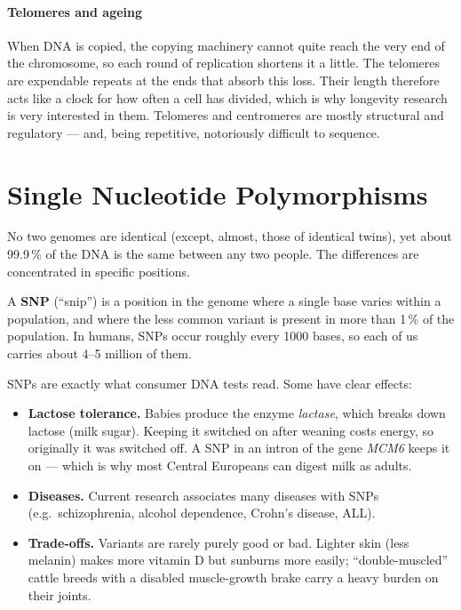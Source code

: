 \documentclass[11pt, oneside]{book}
\let\originalsection\section
\renewcommand{\section}{\Needspace{7\baselineskip}\originalsection}
\begin{document}
\paragraph{Telomeres and ageing}
When DNA is copied, the copying machinery cannot quite reach the very end of
the chromosome, so each round of replication shortens it a little. The
telomeres are expendable repeats at the ends that absorb this loss. Their
length therefore acts like a clock for how often a cell has divided, which is
why longevity research is very interested in them. Telomeres and centromeres
are mostly structural and regulatory --- and, being repetitive, notoriously
difficult to sequence.

\section{Single Nucleotide Polymorphisms}

No two genomes are identical (except, almost, those of identical twins), yet
about 99.9\,\% of the DNA is the same between any two people. The
differences are concentrated in specific positions.

\begin{defbox}[title={Single Nucleotide Polymorphism (SNP)}]
A \textbf{SNP} (``snip'') is a position in the genome where a single base
varies within a population, and where the less common variant is present in
more than 1\,\% of the population. In humans, SNPs occur roughly every 1000
bases, so each of us carries about 4--5 million of them.
\end{defbox}

SNPs are exactly what consumer DNA tests read. Some have clear effects:
\begin{itemize}
  \item \textbf{Lactose tolerance.} Babies produce the enzyme \emph{lactase},
    which breaks down lactose (milk sugar). Keeping it switched on after
    weaning costs energy, so originally it was switched off. A SNP in an
    intron of the gene \emph{MCM6} keeps it on --- which is why most Central
    Europeans can digest milk as adults.
  \item \textbf{Diseases.} Current research associates many diseases with
    SNPs (e.g.\ schizophrenia, alcohol dependence, Crohn's disease, ALL).
  \item \textbf{Trade-offs.} Variants are rarely purely good or bad. Lighter
    skin (less melanin) makes more vitamin D but sunburns more easily;
    ``double-muscled'' cattle breeds with a disabled muscle-growth brake carry
    a heavy burden on their joints.
\end{itemize}
\end{document}
